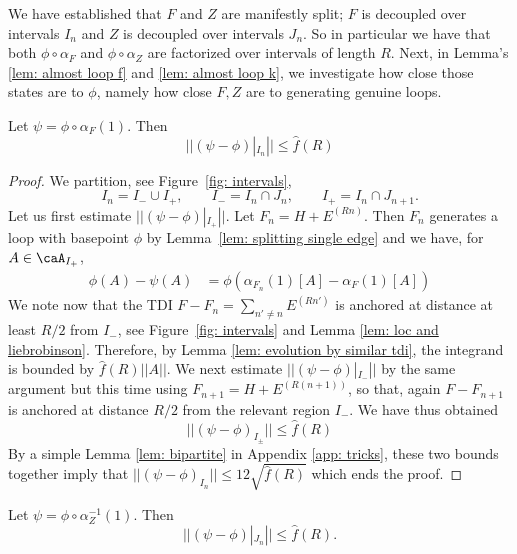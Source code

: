 We have established that $F$ and $Z$  are manifestly split;  $F$ is decoupled over intervals $I_n$ and $Z$ is decoupled over intervals $J_n$. 
So in particular we have that both $\phi \circ \alpha_{F}$ and $\phi \circ \alpha_{Z}$ are factorized over intervals of length $R$.  
Next, in Lemma's \ref{lem: almost loop f} and \ref{lem: almost loop k}, we investigate how close those states are to $\phi$, namely how close $F, Z$ are to generating genuine loops.  
%
%
%
\begin{lemma}\label{lem: almost loop f}
	Let $\psi=\phi \circ \alpha_{F}(1)$. Then
	$$||(\psi  - \phi)|_{{I_n}}|| \leq \hat{f}(R)$$
\end{lemma}
\begin{proof}
	We  partition, see Figure~\ref{fig: intervals},  
	$$I_n= I_- \cup I_+, \qquad  I_-=I_n \cap J_{n}, \qquad I_+=I_n \cap J_{n+1}.$$
	Let us first estimate $||(\psi-\phi)|_{I_{+}}||$.
	Let $F_n=H+E^{(Rn)}$. Then $F_n$ generates a loop with basepoint $\phi$ by Lemma~\ref{lem: splitting single edge} and we have, for $A\in \caA_{I_+}$,
	\begin{align}
		\phi(A)-\psi(A)& = \phi(\alpha_{F_n}(1)[A]- \alpha_{F}(1)[A] )
	\end{align}
	We note now that the TDI $F-F_n=\sum_{n'\neq n } E^{(Rn')}$ is anchored at distance at least $R/2$ from $I_-$, see Figure~\ref{fig: intervals} and Lemma \ref{lem: loc and liebrobinson}.  Therefore, by Lemma \ref{lem: evolution by similar tdi},  the integrand is bounded by  $\hat{f}(R) ||A ||$.
	We next estimate $||(\psi-\phi)|_{I_{-}}||$ by the same argument but this time using $F_{n+1}=H+E^{(R(n+1))}$, so that, again $F-F_{n+1}$ is anchored at distance $R/2$ from the relevant region $I_-$.  We have thus obtained 
	$$
	||(\psi-\phi)_{I_{\pm}}||  \leq \hat{f}(R)
	$$
	By  a simple Lemma \ref{lem: bipartite} in Appendix \ref{app: tricks}, these two bounds together imply that $ ||(\psi-\phi)_{I_n}||\leq 12 \sqrt{\hat{f}(R)} $ which ends the proof.  
\end{proof}
%
%
%
\begin{lemma}\label{lem: almost loop k}
	Let $\psi=\phi \circ \alpha_{Z}^{-1}(1)$. Then
	$$||(\psi  -\phi)|_{J_n}|| \leq \hat{f}(R).$$
\end{lemma}

